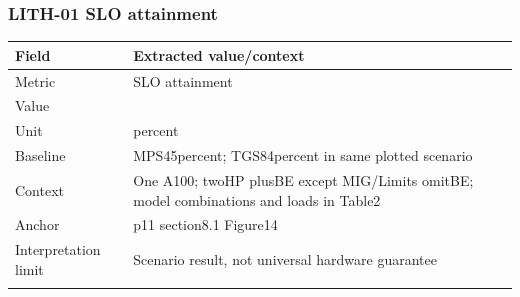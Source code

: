 \subsubsection*{LITH-01 SLO attainment}
\begin{longtable}{>{\raggedright\arraybackslash}p{}>{\raggedright\arraybackslash}p{}}
\toprule
\textbf{Field} & \textbf{Extracted value/context}\\\midrule\endhead
Metric & SLO attainment\\\addlinespace
Value & 100\\\addlinespace
Unit & percent\\\addlinespace
Baseline & MPS45percent;\allowbreak{} TGS84percent in same plotted scenario\\\addlinespace
Context & One A100;\allowbreak{} twoHP plusBE except MIG/Limits omitBE;\allowbreak{} model combinations and loads in Table2\\\addlinespace
Anchor & p11 section8.1 Figure14\\\addlinespace
Interpretation limit & Scenario result,\allowbreak{} not universal hardware guarantee\\\addlinespace
\bottomrule\end{longtable}
